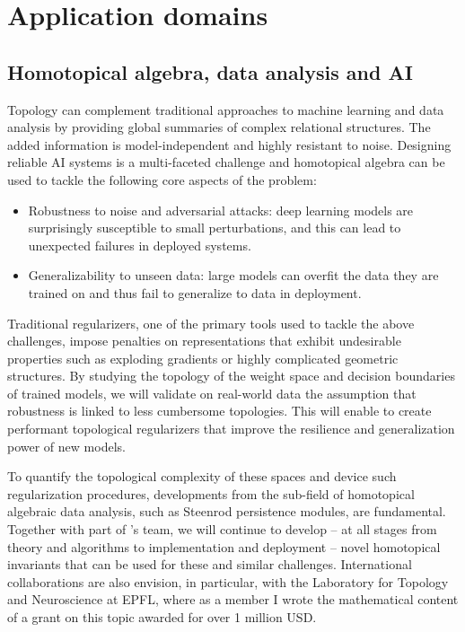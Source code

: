 \section{Application domains} \label{s:future}

\subsection{Homotopical algebra, data analysis and AI} \label{ss:ai}

Topology can complement traditional approaches to machine learning and data analysis by providing global summaries of complex relational structures.
The added information is model-independent and highly resistant to noise.
Designing reliable AI systems is a multi-faceted challenge and homotopical algebra can be used to tackle the following core aspects of the problem:

\begin{itemize}
	\item Robustness to noise and adversarial attacks: deep learning models are surprisingly susceptible to small perturbations, and this can lead to unexpected failures in deployed systems.
	\item Generalizability to unseen data: large models can overfit the data they are trained on and thus fail to generalize to data in deployment.
\end{itemize}
Traditional regularizers, one of the primary tools used to tackle the above challenges, impose penalties on representations that exhibit undesirable properties such as exploding gradients or highly complicated geometric structures.
By studying the topology of the weight space and decision boundaries of trained models, we will validate on real-world data the assumption that robustness is linked to less cumbersome topologies.
This will enable to create performant topological regularizers that improve the resilience and generalization power of new models.

To quantify the topological complexity of these spaces and device such regularization procedures, developments from the sub-field of homotopical algebraic data analysis, such as Steenrod persistence modules, are fundamental.
Together with part of \giottoTDA's team, we will continue to develop -- at all stages from theory and algorithms to implementation and deployment -- novel homotopical invariants that can be used for these and similar challenges.
International collaborations are also envision, in particular, with the Laboratory for Topology and Neuroscience at EPFL, where as a member I wrote the mathematical content of a grant on this topic awarded for over 1 million USD.

